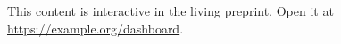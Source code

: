 \begin{tcolorbox}[colback=red!5!white,colframe=red!75!black,title={Interactive content}]

This content is interactive in the living preprint. Open it at \url{https://example.org/dashboard}.

\end{tcolorbox}
